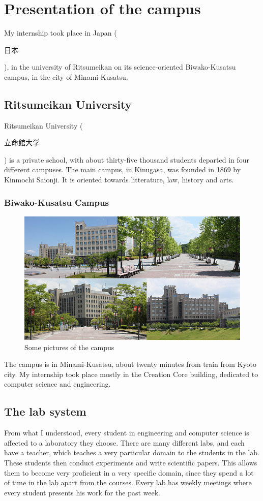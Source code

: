 \chapter{Presentation of the campus}
My internship took place in Japan (\begin{CJK}{UTF8}{min}日本\end{CJK}), in the university of Ritsumeikan on its science-oriented Biwako-Kusatsu campus, in the city of Minami-Kusatsu.
\section{Ritsumeikan University}
Ritsumeikan University (\begin{CJK}{UTF8}{min}立命館大学\end{CJK}) is a private school, with about thirty-five thousand students departed in four different campuses.
The main campus, in Kinugasa, was founded in 1869 by Kinmochi Saionji. It is oriented towards litterature, law, history and arts.
\subsection{Biwako-Kusatsu Campus}
\begin{figure}[h]
  \centering
  \includegraphics[scale=0.7]{rits1.jpg}
  \caption{Some pictures of the campus}
\end{figure}
The campus is in Minami-Kusatsu, about twenty minutes from train from Kyoto city. My internship took place mostly in the Creation Core building, dedicated to computer science and engineering.
\section{The lab system}
From what I understood, every student in engineering and computer science is affected to a laboratory they choose. There are many different labs, and each have a teacher, which teaches a very particular domain to the students in the lab. These students then conduct experiments and write scientific papers. This allows them to become very proficient in a very specific domain, since they spend a lot of time in the lab apart from the courses. Every lab has weekly meetings where every student presents his work for the past week.
